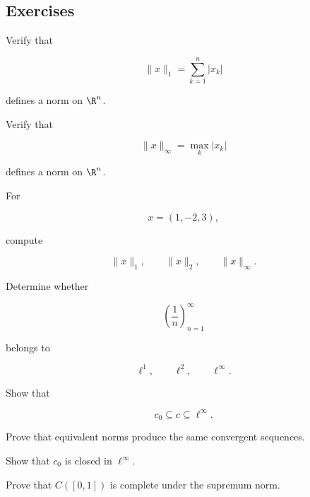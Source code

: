 \subsection{Exercises}
\label{subsec:functional-analysis-exercises}

\begin{exercise}[1]
Verify that

\[
\|x\|_1
=
\sum_{k=1}^{n}|x_k|
\]

defines a norm on \(\R^n\).
\end{exercise}

\begin{exercise}[1]
Verify that

\[
\|x\|_\infty
=
\max_k|x_k|
\]

defines a norm on \(\R^n\).
\end{exercise}

\begin{exercise}[1]
For

\[
x=(1,-2,3),
\]

compute

\[
\|x\|_1,
\qquad
\|x\|_2,
\qquad
\|x\|_\infty.
\]
\end{exercise}

\begin{exercise}[1]
Determine whether

\[
\left(\frac1n\right)_{n=1}^{\infty}
\]

belongs to

\[
\ell^1,
\qquad
\ell^2,
\qquad
\ell^\infty.
\]
\end{exercise}

\begin{exercise}[1]
Show that

\[
c_0\subseteq c\subseteq\ell^\infty.
\]
\end{exercise}

\begin{exercise}[2]
Prove that equivalent norms produce the same convergent sequences.
\end{exercise}

\begin{exercise}[2]
Show that \(c_0\) is closed in \(\ell^\infty\).
\end{exercise}

\begin{exercise}[2]
Prove that \(C([0,1])\) is complete under the supremum norm.
\end{exercise}

